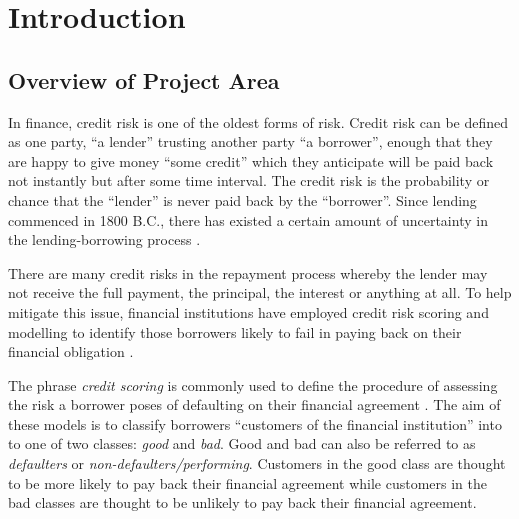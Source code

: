 
\chapter{Introduction} %

\label{Chapter1} %


\section*{Overview of Project Area}

In finance, credit risk is one of the oldest forms of risk. Credit risk can be defined as one party, ``a lender'' trusting another party ``a borrower'', enough that they are happy to give money ``some credit'' which they anticipate will be paid back not instantly but after some time interval. The credit risk is the probability or chance that the ``lender'' is never paid back by the ``borrower''. Since lending commenced in 1800 B.C., there has existed a certain amount of uncertainty in the lending-borrowing process \citep{caouette_managing_1998}.

There are many credit risks in the repayment process whereby the lender may not receive the full payment, the principal, the interest or anything at all. To help mitigate this issue, financial institutions have employed credit risk scoring and modelling to identify those borrowers likely to fail in paying back on their financial obligation \citep{sirirattanaphonkun_default_2012}.

The phrase \textit{credit scoring} is commonly used to define the procedure of assessing the risk a borrower poses of defaulting on their financial agreement \citep{hand_statistical_1997}. The aim of these models is to classify borrowers ``customers of the financial institution'' into to one of two classes: \textit{good} and \textit{bad}. Good and bad can also be referred to as \textit{defaulters} or \textit{non-defaulters/performing}. Customers in the good class are thought to be more likely to pay back their financial agreement while customers in the bad classes are thought to be unlikely to pay back their financial agreement. 

